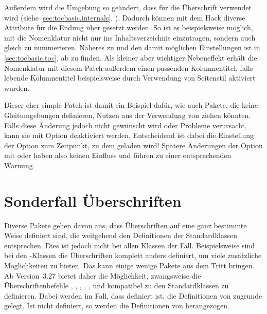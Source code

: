 Außerdem wird die Umgebung
 so geändert,
dass  für
die Überschrift verwendet wird (siehe \autoref{sec:tocbasic.internals},
). Dadurch können mit dem Hack
diverse Attribute für die Endung  über
%
 gesetzt werden. So ist es
beispielsweise möglich, mit
 die
Nomenklatur nicht nur ins Inhaltsverzeichnis einzutragen, sondern auch gleich
zu nummerieren. Näheres zu  und den damit
möglichen Einstellungen ist in \autoref{sec:tocbasic.toc}, ab
 zu finden.  Als kleiner aber wichtiger
Nebeneffekt erhält die Nomenklatur mit diesem Patch außerdem einen passenden
Kolumnentitel, falls lebende Kolumnentitel beispielsweise durch Verwendung von
Seitenstil  aktiviert wurden.

Dieser eher simple Patch ist damit ein Beispiel dafür, wie auch Pakete, die
keine Gleitumgebungen definieren, Nutzen aus der Verwendung von
 ziehen könnten.  Falls diese Änderung jedoch nicht
gewünscht wird oder Probleme verursacht, kann sie mit Option
deaktiviert werden. Entscheidend ist dabei die Einstellung
der Option zum Zeitpunkt, zu dem  geladen wird! Spätere
Änderungen der Option mit  oder
 haben also keinen Einfluss und führen zu
einer entsprechenden Warnung.%


\section{Sonderfall Überschriften}

Diverse Pakete gehen davon aus, dass
Überschriften auf eine ganz bestimmte Weise definiert sind, die weitgehend den
Definitionen der Standardklassen entsprechen. Dies ist jedoch nicht bei allen
Klassen der Fall. Beispielsweise sind bei den \KOMAScript-Klassen die
Überschriften komplett anders definiert, um viele zusätzliche Möglichkeiten zu
bieten. Das kann einige wenige Pakete aus dem Tritt bringen. Ab Version~3.27
bietet  daher die Möglichkeit, zwangsweise die
Überschriftenbefehle ,
,
,
,
,
 und
 kompatibel zu den
Standardklassen zu definieren. Dabei werden im Fall, dass
 definiert ist, die Definitionen von 
zugrunde gelegt. Ist  nicht definiert, so werden
die Definitionen von  herangezogen.

